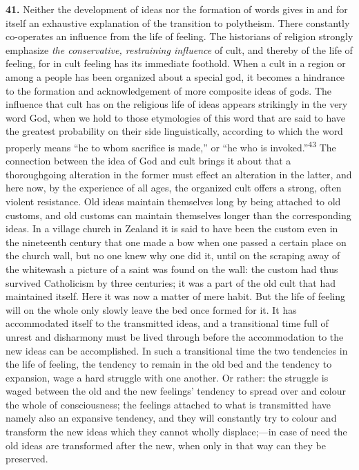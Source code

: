 \documentclass[12pt,a4paper]{book}
\newcommand{\opage}[1]{\marginnote{\footnotesize\textit{[#1]}}}
\begin{document}
\noindent\textbf{41.} Neither the development of ideas nor the formation of words gives in
and for itself an exhaustive explanation of the transition to polytheism. There constantly
co-operates an influence from the life of feeling. The historians of religion strongly
emphasize \emph{the conservative, restraining influence} of cult, and thereby of the life
of feeling, for in cult feeling has its immediate foothold. When a cult in a region or
among a people has been organized about a special god, it becomes a hindrance to the
formation and acknowledgement of more composite ideas of gods. The influence that cult has
on the religious life of ideas appears strikingly in the very word God, when we hold to
those etymologies of this word that are said to have the greatest probability on their side
linguistically, according to which the word properly means ``he to whom sacrifice is made,''
or ``he who is invoked.''\textsuperscript{43} The connection between the idea of God and
cult brings it about that a thoroughgoing alteration in the former must effect an alteration
in the latter, and here now, by the experience of all ages, the organized cult offers a
strong, often violent resistance. Old ideas maintain themselves long by being attached to
old customs, and old customs can maintain themselves longer than the corresponding ideas. In
a village church in Zealand it is said to have been the custom even in the nineteenth century
that one made a bow when one passed a certain place on the church wall, but no one knew why
one did it, until on the scraping away of the whitewash a picture of a saint was found on the
wall: the custom had thus survived Catholicism by three centuries; it was a part of the old
cult that had maintained itself. Here it was now a matter of mere 
\opage{96}habit. But the life of
feeling will on the whole only slowly leave the bed once formed for it. It has accommodated
itself to the transmitted ideas, and a transitional time full of unrest and disharmony must
be lived through before the accommodation to the new ideas can be accomplished. In such a
transitional time the two tendencies in the life of feeling, the tendency to remain in the
old bed and the tendency to expansion, wage a hard struggle with one another. Or rather: the
struggle is waged between the old and the new feelings' tendency to spread over and colour the
whole of consciousness; the feelings attached to what is transmitted have namely also an
expansive tendency, and they will constantly try to colour and transform the new ideas which
they cannot wholly displace;---in case of need the old ideas are transformed after the new,
when only in that way can they be preserved.
\end{document}
